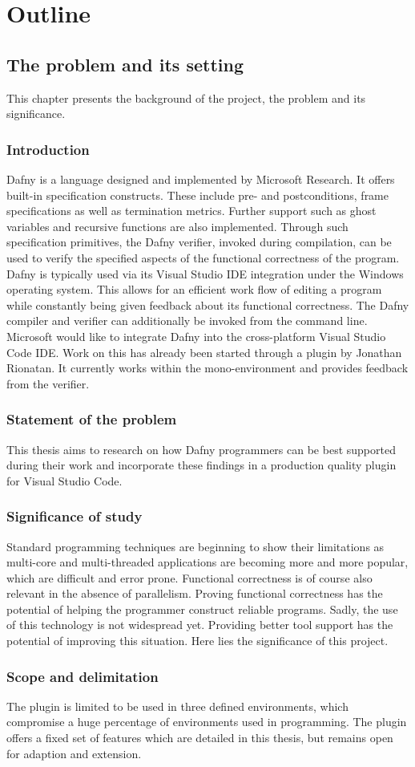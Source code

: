 \section{Outline}
\subsection{The problem and its setting}
This chapter presents the background of the project, the problem and its significance.
\subsubsection{Introduction}
Dafny is a language designed and implemented by Microsoft Research. It offers built-in specification constructs. These include pre- and postconditions, frame specifications as well as termination metrics. Further support such as ghost variables and recursive functions are also implemented. Through such specification primitives, the Dafny verifier, invoked during compilation, can be used to verify the specified aspects of the functional correctness of the program. \newline
Dafny is typically used via its Visual Studio IDE integration under the Windows operating system. This allows for an efficient work flow of editing a program while constantly being given feedback about its functional correctness. The Dafny compiler and verifier can additionally be invoked from the command line. \newline
Microsoft would like to integrate Dafny into the cross-platform Visual Studio Code IDE. Work on this has already been started through a plugin by Jonathan Rionatan. It currently works within the mono-environment and provides feedback from the verifier. 
\subsubsection{Statement of the problem}
This thesis aims to research on how Dafny programmers can be best supported during their work and incorporate these findings in a production quality plugin for Visual Studio Code. 
\subsubsection{Significance of study}
Standard programming techniques are beginning to show their limitations as multi-core and multi-threaded applications are becoming more and more popular, which are difficult and error prone. Functional correctness is of course also relevant in the absence of parallelism. 
Proving functional correctness has the potential of helping the programmer construct reliable programs.
Sadly, the use of this technology is not widespread yet. Providing better tool support has the potential of improving this situation. Here lies the significance of this project.
\subsubsection{Scope and delimitation}
The plugin is limited to be used in three defined environments, which compromise a huge percentage of environments used in programming. The plugin offers a fixed set of features which are detailed in this thesis, but remains open for adaption and extension.